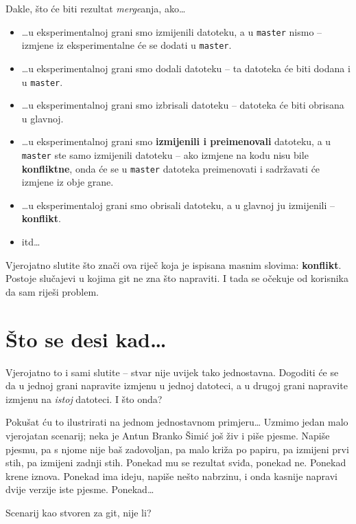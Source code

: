 

Dakle, što će biti rezultat \emph{merge}anja, ako\dots

\begin{itemize}
	\item \dots{}u eksperimentalnoj grani smo izmijenili datoteku, a u \verb+master+ nismo -- izmjene iz eksperimentalne će se dodati u \verb+master+.
	\item \dots{}u eksperimentalnoj grani smo dodali datoteku -- ta datoteka će biti dodana i u \verb+master+.
	\item \dots{}u eksperimentalnoj grani smo izbrisali datoteku -- datoteka će biti obrisana u glavnoj.
	\item \dots{}u eksperimentalnoj grani smo \textbf{izmijenili i preimenovali} datoteku, a u \verb+master+ ste samo izmijenili datoteku -- ako izmjene na kodu nisu bile \textbf{konfliktne}, onda će se u \verb+master+ datoteka preimenovati i sadržavati će izmjene iz obje grane.
	\item \dots{}u eksperimentaloj grani smo obrisali datoteku, a u glavnoj ju izmijenili -- \textbf{konflikt}.
	\item itd\dots
\end{itemize}

Vjerojatno slutite što znači ova riječ koja je ispisana masnim slovima: \textbf{konflikt}.
Postoje slučajevi u kojima git ne zna što napraviti. 
I tada se očekuje od korisnika da sam riješi problem. 

\section*{Što se desi kad\dots}

Vjerojatno to i sami slutite -- stvar nije uvijek tako jednostavna.
Dogoditi će se da u jednoj grani napravite izmjenu u jednoj datoteci, a u drugoj grani napravite izmjenu na \emph{istoj} datoteci.
I što onda?

Pokušat ću to ilustrirati na jednom jednostavnom primjeru\dots
Uzmimo jedan malo vjerojatan scenarij; neka je Antun Branko Šimić još živ i piše pjesme.
Napiše pjesmu, pa s njome nije baš zadovoljan, pa malo križa po papiru, pa izmijeni prvi stih, pa izmijeni zadnji stih.
Ponekad mu se rezultat sviđa, ponekad ne.
Ponekad krene iznova.
Ponekad ima ideju, napiše nešto nabrzinu, i onda kasnije napravi dvije verzije iste pjesme.
Ponekad\dots

Scenarij kao stvoren za git, nije li?

